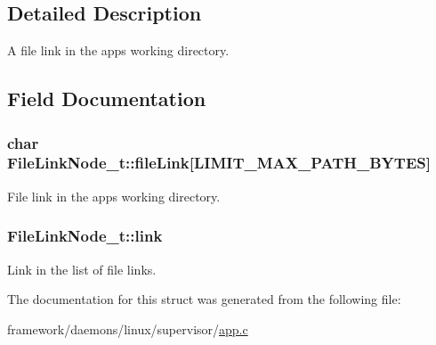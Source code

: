 \subsection{Detailed Description}
A file link in the app\textquotesingle{}s working directory. 

\subsection{Field Documentation}
\subsubsection[{\texorpdfstring{file\+Link}{fileLink}}]{\setlength{\rightskip}{0pt plus 5cm}char File\+Link\+Node\+\_\+t\+::file\+Link\mbox{[}{\bf L\+I\+M\+I\+T\+\_\+\+M\+A\+X\+\_\+\+P\+A\+T\+H\+\_\+\+B\+Y\+T\+ES}\mbox{]}}\hypertarget{struct_file_link_node__t_ae0cb1cd03c2a85658fb6da5af566c077}{}\label{struct_file_link_node__t_ae0cb1cd03c2a85658fb6da5af566c077}


File link in the app\textquotesingle{}s working directory. 

\subsubsection[{\texorpdfstring{link}{link}}]{ File\+Link\+Node\+\_\+t\+::link}\hypertarget{struct_file_link_node__t_ae78e8cda15fd5895330bc48b07bbf9fe}{}\label{struct_file_link_node__t_ae78e8cda15fd5895330bc48b07bbf9fe}


Link in the list of file links. 



The documentation for this struct was generated from the following file\+:\begin{DoxyCompactItemize}
\item 
framework/daemons/linux/supervisor/\hyperlink{supervisor_2app_8c}{app.\+c}\end{DoxyCompactItemize}
